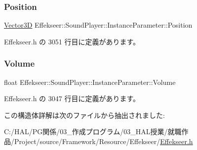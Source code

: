 \subsubsection{\texorpdfstring{Position}{Position}}
{\footnotesize\ttfamily \mbox{\hyperlink{struct_effekseer_1_1_vector3_d}{Vector3D}} Effekseer\+::\+Sound\+Player\+::\+Instance\+Parameter\+::\+Position}



 Effekseer.\+h の 3051 行目に定義があります。

\mbox{\label{struct_effekseer_1_1_sound_player_1_1_instance_parameter_ab128c51dd7ae26cc09c6a3ee716b9a14}} 
\subsubsection{\texorpdfstring{Volume}{Volume}}
{\footnotesize\ttfamily float Effekseer\+::\+Sound\+Player\+::\+Instance\+Parameter\+::\+Volume}



 Effekseer.\+h の 3047 行目に定義があります。



この構造体詳解は次のファイルから抽出されました\+:\begin{DoxyCompactItemize}
\item 
C\+:/\+H\+A\+L/\+P\+G関係/03\+\_\+作成プログラム/03\+\_\+\+H\+A\+L授業/就職作品/\+Project/source/\+Framework/\+Resource/\+Effekseer/\mbox{\hyperlink{_effekseer_8h}{Effekseer.\+h}}\end{DoxyCompactItemize}
